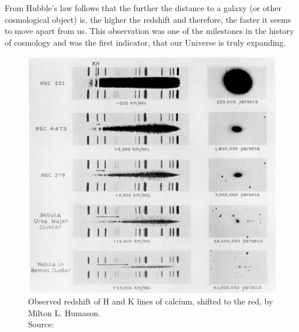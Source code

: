 \noindent From Hubble's law follows that the further the distance to a galaxy (or other cosmological object) is, the higher the redshift and therefore, the faster it seems to move apart from us. This observation was one of the milestones in the history of cosmology and was the first indicator, that our Universe is truly expanding.


\begin{figure}[H]
    \begin{minipage}{8cm}
        \centering 
        \includegraphics[scale=0.3]{figures/images/humason_redshifts-in-the-spectra-of-extra-galactic-nebulae.png}
        \caption{Observed redshift of H and K lines of calcium, shifted to the red, by Milton L. Humason.  \\ 
        Source: \cite[Figure ``Red-shifts in the Spectra of Extra-galactic Nebulae'']{Humason1936}}
    \end{minipage}
    \hspace{1cm}
    \begin{minipage}{8cm}
        \centering

\end{minipage}
\end{figure}
